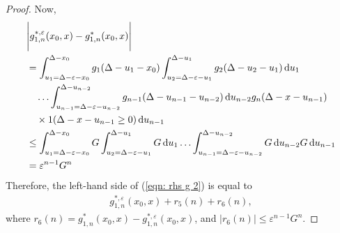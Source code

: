 \begin{proof}
	Now, 
	\begin{align*}
		&\Bigg|g_{1,n}^{*,\varepsilon}(x_0,x) - g_{1,n}^{*}(x_0,x)
		\Bigg|\nonumber
		\\&= \int_{u_1=\Delta-\varepsilon-x_0}^{\Delta-x_0}g_1(\Delta - u_1 - x_0)
		\int_{u_2=\Delta-\varepsilon-u_1}^{\Delta-u_1}g_2(\Delta - u_2 - u_1)\, \mathrm{d} u_1  \nonumber 
		\\&\quad\hdots 
            	\int_{u_{n-1}=\Delta-\varepsilon-u_{n-2}}^{\Delta-u_{n-2}} g_{n-1}(\Delta - u_{n-1} - u_{n-2}) \, \mathrm{d} u_{n-2}
            	g_{n}(\Delta - x-u_{n-1})\nonumber 
		\\&\quad\times 1(\Delta - x-u_{n-1}\geq 0)\, \mathrm{d} u_{n-1}\nonumber
		\\&\leq \int_{u_1=\Delta-\varepsilon-x_0}^{\Delta-x_0}G 
		\int_{u_2=\Delta-\varepsilon-u_1}^{\Delta-u_1}G \, \mathrm{d} u_1  \hdots 
            	\int_{u_{n-1}=\Delta-\varepsilon-u_{n-2}}^{\Delta-u_{n-2}} G \, \mathrm{d} u_{n-2}\nonumber
            	G\, \mathrm{d} u_{n-1} 
		\\& = \varepsilon^{n-1}G ^n 
	\end{align*}
	Therefore, the left-hand side of (\ref{eqn: rhs g 2}) is equal to 
	\begin{align*}
		g^{*,\varepsilon}_{1,n}(x_0,x) + r_5(n) + r_6(n),
	\end{align*}
	where \(r_6(n) = g_{1,n}^{*}(x_0,x) - g_{1,n}^{*,\varepsilon}(x_0,x) \), and \(|r_6(n)|\leq \varepsilon^{n-1}G ^n\).
\end{proof}



